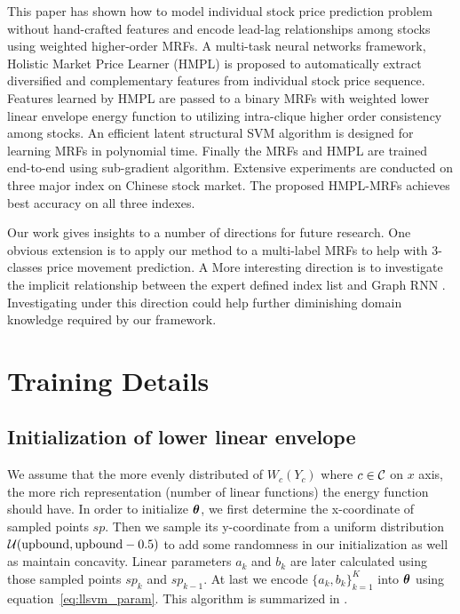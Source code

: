 \documentclass[sigconf,anonymous,review]{acmart}
\renewcommand{\cite}{\citep}
\begin{document}
This paper has shown how to model individual stock price
prediction problem without hand-crafted features and encode
lead-lag relationships among stocks using weighted higher-order
MRFs. A multi-task neural networks framework, Holistic Market
Price Learner (HMPL) is proposed to automatically extract
diversified and complementary features from individual stock
price sequence. Features learned by HMPL are passed to a binary
MRFs with weighted lower linear envelope energy function to
utilizing intra-clique higher order consistency among stocks. An
efficient latent structural SVM algorithm is designed for
learning MRFs in polynomial time. Finally the MRFs and HMPL are
trained end-to-end using sub-gradient algorithm. Extensive
experiments are conducted on three major index on Chinese stock
market. The proposed HMPL-MRFs achieves best accuracy on all
three indexes.

Our work gives insights to a number of directions for future
research. One obvious extension is to apply our method to a multi-label
MRFs to help with 3-classes price movement prediction. A More interesting direction is to investigate the implicit relationship between the expert defined index list and Graph RNN \cite{you2018graphrnn}. Investigating under this direction could help further diminishing domain knowledge required by our framework.




%


\newpage

\appendix

\section{Training Details}
\label{sec:train_detail}

\subsection{Initialization of lower linear envelope}
\label{sec:sup_init}

We assume that the more evenly distributed of $W_c(Y_c)$ where
$c\in\cal C$ on $x$ axis, the more rich representation (number of
linear functions) the energy function should have. In order to
initialize $\boldsymbol{\theta}$, we first determine the x-coordinate of
sampled points $sp$. Then we sample its y-coordinate from a
uniform distribution ${\cal U}(\text{upbound},\text{upbound}-0.5)$ to add some
randomness in our initialization as well as maintain concavity.
Linear parameters $a_k$ and $b_k$ are later calculated using
those sampled points $sp_k$ and $sp_{k-1}$. At last we encode
$\{a_k,b_k\}_{k=1}^K$ into $\boldsymbol{\theta}$ using
equation~\eqref{eq:llsvm_param}. This algorithm is summarized in
.
\end{document}
